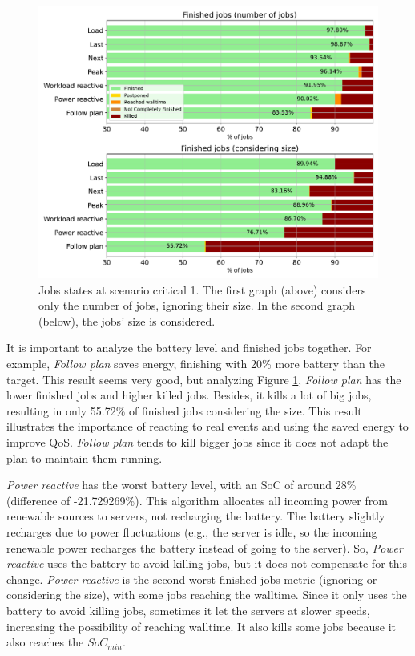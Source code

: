 \begin{figure}[!htb]
    \centering
    \includegraphics[scale=0.55]{Images/Compensations/jobs_critical_1.pdf}
    \caption[Jobs states at scenario critical 1.]{Jobs states at scenario critical 1. The first graph (above) considers only the number of jobs, ignoring their size. In the second graph (below), the jobs' size is considered.}
    \label{fig:jobs_critical_1}
\end{figure}

It is important to analyze the battery level and finished jobs together. For example, \emph{Follow plan} saves energy, finishing with 20\% more battery than the target. This result seems very good, but analyzing Figure \ref{fig:jobs_critical_1}, \emph{Follow plan} has the lower finished jobs and higher killed jobs. Besides, it kills a lot of big jobs, resulting in only 55.72\% of finished jobs considering the size. This result illustrates the importance of reacting to real events and using the saved energy to improve QoS. \emph{Follow plan} tends to kill bigger jobs since it does not adapt the plan to maintain them running.

\emph{Power reactive} has the worst battery level, with an SoC of around 28\% (difference of -21.729269\%). This algorithm allocates all incoming power from renewable sources to servers, not recharging the battery. The battery slightly recharges due to power fluctuations (e.g., the server is idle, so the incoming renewable power recharges the battery instead of going to the server). So, \emph{Power reactive} uses the battery to avoid killing jobs, but it does not compensate for this change. \emph{Power reactive} is the second-worst finished jobs metric (ignoring or considering the size), with some jobs reaching the walltime. Since it only uses the battery to avoid killing jobs, sometimes it let the servers at slower speeds, increasing the possibility of reaching walltime. It also kills some jobs because it also reaches the $SoC_{min}$.

